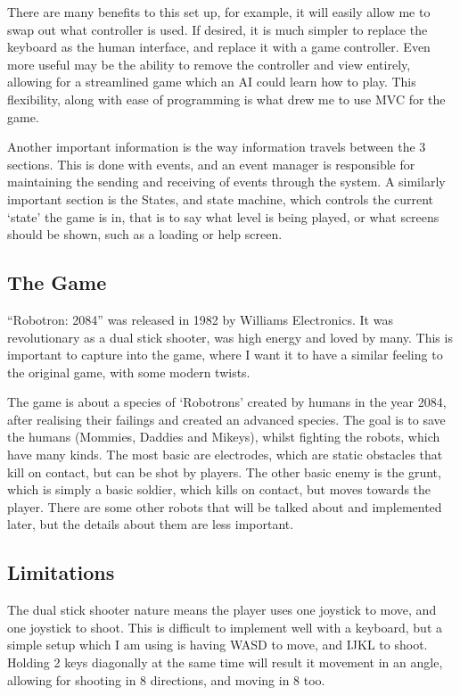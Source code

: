 \documentclass{article}
\begin{document}
There are many benefits to this set up, for example, it will easily allow me to swap out what controller is used. If desired, it is much simpler to replace the keyboard as the human interface, and replace it with a game controller. Even more useful may be the ability to remove the controller and view entirely, allowing for a streamlined game which an AI could learn how to play. This flexibility, along with ease of programming is what drew me to use MVC for the game.

Another important information is the way information travels between the 3 sections. This is done with events, and an event manager is responsible for maintaining the sending and receiving of events through the system. A similarly important section is the States, and state machine, which controls the current ‘state’ the game is in, that is to say what level is being played, or what screens should be shown, such as a loading or help screen.

\subsection{The Game}
“Robotron: 2084” was released in 1982 by Williams Electronics. It was revolutionary as a dual stick shooter, was high energy and loved by many. This is important to capture into the game, where I want it to have a similar feeling to the original game, with some modern twists. 

The game is about a species of ‘Robotrons’ created by humans in the year 2084, after realising their failings and created an advanced species. The goal is to save the humans (Mommies, Daddies and Mikeys), whilst fighting the robots, which have many kinds. The most basic are electrodes, which are static obstacles that kill on contact, but can be shot by players. The other basic enemy is the grunt, which is simply a basic soldier, which kills on contact, but moves towards the player.
There are some other robots that will be talked about and implemented later, but the details about them are less important. 

\subsection{Limitations}
The dual stick shooter nature means the player uses one joystick to move, and one joystick to shoot. This is difficult to implement well with a keyboard, but a simple setup which I am using is having WASD to move, and IJKL to shoot. Holding 2 keys diagonally at the same time will result it movement in an angle, allowing for shooting in 8 directions, and moving in 8 too.
\end{document}
